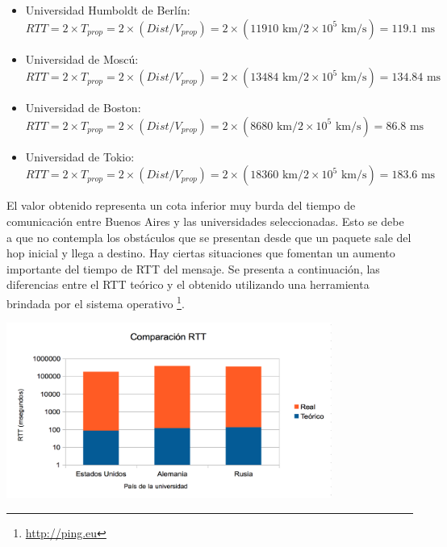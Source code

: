 \begin{itemize}
 \item Universidad Humboldt de Berlín:
\begin{equation}
 	RTT = 2 \times T_{prop} = 2 \times (Dist / V_{prop}) = 2 \times (11910 \text{ km} / 2\times10^5 \text{ km/s}) = 119.1  \text{ ms}
\end{equation}

 \item Universidad de Moscú:
 \begin{equation}
 	RTT = 2 \times T_{prop} = 2 \times (Dist / V_{prop}) = 2 \times (13484 \text{ km} / 2\times10^5 \text{ km/s}) = 134.84 \text{ ms}
 \end{equation}

 \item Universidad de Boston:
 \begin{equation}
 	RTT = 2 \times T_{prop} = 2 \times (Dist / V_{prop}) = 2 \times (8680 \text{ km} / 2\times10^5 \text{ km/s}) = 86.8 \text{ ms}
 \end{equation}

 \item Universidad de Tokio:
 \begin{equation}
 	RTT = 2 \times T_{prop} = 2 \times (Dist / V_{prop}) = 2 \times (18360  \text{ km} / 2\times10^5 \text{ km/s}) = 183.6 \text{ ms}
 \end{equation}

\end{itemize}

El valor obtenido representa un cota inferior muy burda del tiempo de comunicación entre Buenos Aires y las universidades seleccionadas. Esto se debe a que no contempla los obstáculos que se presentan desde que un paquete sale del hop inicial y llega a destino. Hay ciertas situaciones que fomentan un aumento importante del tiempo de RTT del mensaje. Se presenta a continuación, las diferencias entre el RTT teórico y el obtenido utilizando una herramienta brindada por el sistema operativo \footnote{\url{http://ping.eu}{}}.

\centerline{\includegraphics[width=0.8\textwidth]{imagenes/1ra_parte/1Parte-comparacionRTT}}

